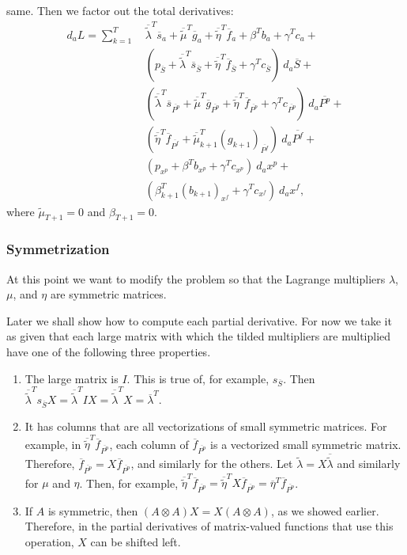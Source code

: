 \documentclass[10pt,fleqn]{article}
\renewcommand{\vec}[1]{\ensuremath{\overline{#1}}}
\begin{document}
same. Then we factor out the total derivatives:
\begin{align*}
  d_a L = \sum_{k = 1}^T \ & \vec{\tilde\lambda}^T \vec s_a +
    \vec{\tilde\mu}^T \vec g_a + \vec{\tilde\eta}^T \vec f_a + \beta^T b_a +
    \gamma^T c_a + \\
  & (p_{\vec S} + \vec{\tilde\lambda}^T \vec s_{\vec S} +
     \vec{\tilde\eta}^T \vec f_{\vec S} +
     \gamma^T c_{\vec S}) \ d_a \vec S + \\
  & (\vec{\tilde\lambda}^T \vec s_{\vec{P^p}} +
     \vec{\tilde\mu}^T \vec g_{\vec{P^p}} +
     \vec{\tilde\eta}^T \vec f_{\vec{P^p}} +
     \gamma^T c_{\vec{P^p}}) \ d_a \vec{P^p} + \\
  & (\vec{\tilde\eta}^T \vec f_{\vec{P^f}} +
     \vec{\tilde\mu}_{k+1}^T (g_{k+1})_{\vec{P^f}}) \ d_a \vec{P^f} + \\
  & (p_{x^p} + \beta^T b_{x^p} + \gamma^T c_{x^p}) \ d_a x^p + \\
  & (\beta_{k+1}^T (b_{k+1})_{x^f} + \gamma^T c_{x^f}) \ d_a x^f,
\end{align*}
where $\tilde\mu_{T+1} = 0$ and $\beta_{T+1} = 0$.

\subsubsection{Symmetrization}
At this point we want to modify the problem so that the Lagrange multipliers
$\lambda$, $\mu$, and $\eta$ are symmetric matrices.

Later we shall show how to compute each partial derivative. For now we take it
as given that each large matrix with which the tilded multipliers are multiplied
have one of the following three properties.
\begin{enumerate}
\item The large matrix is $I$. This is true of, for example, $s_{\vec S}$. Then
  $\vec{\tilde\lambda}^T s_{\vec S} X = \vec{\tilde\lambda}^T I X =
  \vec{\tilde\lambda}^T X = \vec \lambda^T$.
\item It has columns that are all vectorizations of small symmetric
  matrices. For example, in $\vec{\tilde\eta}^T \vec f_{\vec{P^p}}$, each column
  of $\vec f_{\vec{P^p}}$ is a vectorized small symmetric matrix. Therefore,
  $\vec f_{\vec{P^p}} = X \vec f_{\vec{P^p}}$, and similarly for the others. Let
  $\tilde\lambda = X \vec{\tilde\lambda}$ and similarly for $\mu$ and
  $\eta$. Then, for example, $\vec{\tilde\eta}^T \vec f_{\vec{P^p}} =
  \vec{\tilde\eta}^T X \vec f_{\vec{P^p}} = \vec\eta^T \vec f_{\vec{P^p}}$.
\item If $A$ is symmetric, then $(A \otimes A) X = X (A \otimes A)$, as we
  showed earlier. Therefore, in the partial derivatives of matrix-valued
  functions that use this operation, $X$ can be shifted left.
\end{enumerate}
\end{document}
